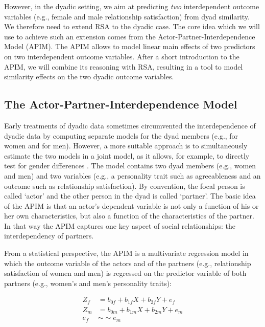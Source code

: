 \documentclass[jou,a4paper,draftfirst]{apa6}
\begin{document}
However, in the dyadic setting, we aim at predicting \emph{two} interdependent outcome variables (e.g., female and male relationship satisfaction) from dyad similarity. We therefore need to extend RSA to the dyadic case. The core idea which we will use to achieve such an extension comes from the Actor-Partner-Interdependence Model (APIM). The APIM allows to model linear main effects of two predictors on two interdependent outcome variables. After a short introduction to the APIM, we will combine its reasoning with RSA, resulting in a tool to model similarity effects on the two dyadic outcome variables.

\subsection{The Actor-Partner-Interdependence Model}
Early treatments of dyadic data sometimes circumvented the interdependence of dyadic data by computing separate models for the dyad members (e.g., for women and for men). However, a more suitable approach is to simultaneously estimate the two models in a joint model, as it allows, for example, to directly test for gender differences \parencite{kenny_dyadic_2006}. The model contains two dyad members (e.g., women and men) and two variables (e.g., a personality trait such as agreeableness and an outcome such as relationship satisfaction). By convention, the focal person is called ‘actor’ and the other person in the dyad is called ‘partner’. The basic idea of the APIM is that an actor's dependent variable is not only a function of his or her own characteristics, but also a function of the characteristics of the partner. In that way the APIM captures one key aspect of social relationships: the interdependency of partners.

From a statistical perspective, the APIM is a multivariate regression model \parencite[cf.][]{kenny_dyadic_2006,NestlerEtAl2015} in which the outcome variable of the actors and of the partners (e.g., relationship satisfaction of women and men) is regressed on the predictor variable of both partners (e.g., women's and men's personality traits):

\begin{equation}
\label{al:apim}
\begin{split}
Z_{f} &= b_{0f} + b_{1f} X + b_{2f} Y + e_{f} \\
Z_{m} &= b_{0m} + b_{1m} X + b_{2m} Y + e_{m} \\
e_f &\sim\sim e_m
\end{split}
\end{equation}
\end{document}
